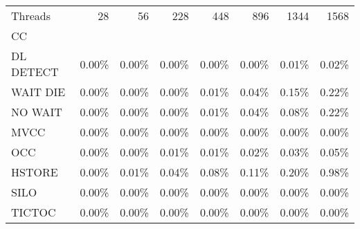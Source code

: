 \begin{tabular}{lrrrrrrr}
\toprule
Threads &  28   &  56   &  228  &  448  &  896  &  1344 &  1568 \\
CC        &       &       &       &       &       &       &       \\
\midrule
DL DETECT & 0.00\% & 0.00\% & 0.00\% & 0.00\% & 0.00\% & 0.01\% & 0.02\% \\
WAIT DIE  & 0.00\% & 0.00\% & 0.00\% & 0.01\% & 0.04\% & 0.15\% & 0.22\% \\
NO WAIT   & 0.00\% & 0.00\% & 0.00\% & 0.01\% & 0.04\% & 0.08\% & 0.22\% \\
MVCC      & 0.00\% & 0.00\% & 0.00\% & 0.00\% & 0.00\% & 0.00\% & 0.00\% \\
OCC       & 0.00\% & 0.00\% & 0.01\% & 0.01\% & 0.02\% & 0.03\% & 0.05\% \\
HSTORE    & 0.00\% & 0.01\% & 0.04\% & 0.08\% & 0.11\% & 0.20\% & 0.98\% \\
SILO      & 0.00\% & 0.00\% & 0.00\% & 0.00\% & 0.00\% & 0.00\% & 0.00\% \\
TICTOC    & 0.00\% & 0.00\% & 0.00\% & 0.00\% & 0.00\% & 0.00\% & 0.00\% \\
\bottomrule
\end{tabular}
